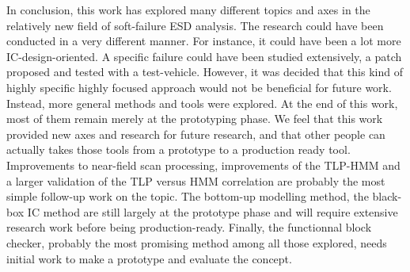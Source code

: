 In conclusion, this work has explored many different topics and axes in the relatively new field of soft-failure ESD analysis.
The research could have been conducted in a very different manner.
For instance, it could have been a lot more IC-design-oriented.
A specific failure could have been studied extensively, a patch proposed and tested with a test-vehicle.
However, it was decided that this kind of highly specific highly focused approach would not be beneficial for future work.
Instead, more general methods and tools were explored.
At the end of this work, most of them remain merely at the prototyping phase.
We feel that this work provided new axes and research for future research, and that other people can actually takes those tools from a prototype to a production ready tool.
Improvements to near-field scan processing, improvements of the TLP-HMM and a larger validation of the TLP versus HMM correlation are probably the most simple follow-up work on the topic.
The bottom-up modelling method, the black-box IC method are still largely at the prototype phase and will require extensive research work before being production-ready.
Finally, the functionnal block checker, probably the most promising method among all those explored, needs initial work to make a prototype and evaluate the concept.
